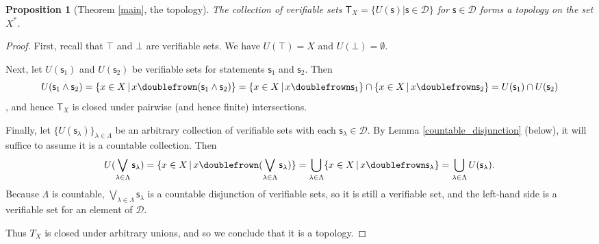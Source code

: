 \documentclass[psamsfonts]{amsart}
\newtheorem{prop}[thm]{Proposition}
\theoremstyle{definition}
\theoremstyle{remark}
\numberwithin{equation}{section}
\def\tautology{\top}
\def\contradiction{\bot}
\def\comp{\doublefrown}
\def\AND{\wedge}
\def\bigOR{\bigvee}
\newcommand{\stmt}[1][s] {\mathsf{#1}}
\newcommand{\obs}[1][s] {\mathsf{#1}}
\newcommand{\edomain}[1][D] {\mathcal{#1}}
\begin{document}
\begin{prop}[Theorem \ref{main}, the topology]
\label{topology}
The collection of verifiable sets $\mathsf{T}_X=\{U(\stmt)|\stmt\in\edomain\}$ for $\stmt\in\edomain$ forms a topology on the set $X^*$. 
\end{prop}
\begin{proof}
First, recall that $\tautology$ and $\contradiction$ are verifiable sets. We have $U(\tautology) = X$ and $U(\contradiction) = \emptyset$. 

Next, let $U(\stmt_1)$ and $U(\stmt_2)$ be verifiable sets for statements $\stmt_1$ and $\stmt_2$. Then $$U(\obs_1\AND\obs_2) = \{ x \in X \, | \, x \comp (\obs_1\AND\obs_2)\} =  \{ x \in X \, | \, x \comp \obs_1\} \cap \{ x \in X \, | \, x \comp \obs_2\} = U(\obs_1) \cap U(\obs_2)$$, and hence $\mathsf{T}_X$ is closed under pairwise (and hence finite) intersections. 

Finally, let $\{U(\stmt_{\lambda})\}_{\lambda\in\Lambda}$ be an arbitrary collection of verifiable sets with each $\stmt_{\lambda}\in\edomain$. By Lemma \ref{countable_disjunction} (below), it will suffice to assume it is a countable collection. Then $$U(\bigOR\limits_{\lambda\in\Lambda}\stmt_{\lambda}) = \{ x \in X \, | \, x \comp (\bigOR\limits_{\lambda\in\Lambda}\stmt_{\lambda})\} =\bigcup\limits_{\lambda\in\Lambda} \{ x \in X \, | \, x \comp \stmt_{\lambda}\} = \bigcup\limits_{\lambda\in\Lambda} U(\obs_{\lambda}).$$ Because $\Lambda$ is countable, $\bigOR\limits_{\lambda\in\Lambda}\stmt_{\lambda}$ is a countable disjunction of verifiable sets, so it is still a verifiable set, and the left-hand side is a verifiable set for an element of $\edomain$. 

Thus $T_X$ is closed under arbitrary unions, and so we conclude that it is a topology.
\end{proof}
\end{document}
